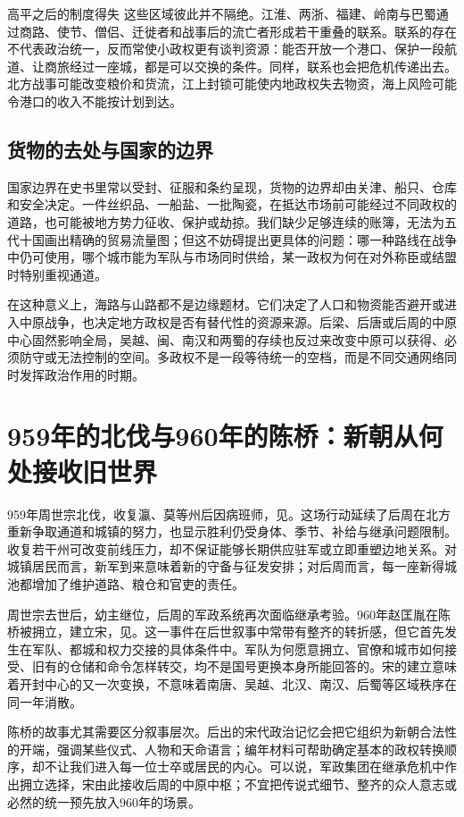 \begin{causalchain}{高平之后的制度得失}
这些区域彼此并不隔绝。江淮、两浙、福建、岭南与巴蜀通过商路、使节、僧侣、迁徙者和战事后的流亡者形成若干重叠的联系。联系的存在不代表政治统一，反而常使小政权更有谈判资源：能否开放一个港口、保护一段航道、让商旅经过一座城，都是可以交换的条件。同样，联系也会把危机传递出去。北方战事可能改变粮价和货流，江上封锁可能使内地政权失去物资，海上风险可能令港口的收入不能按计划到达。

\subsection{货物的去处与国家的边界}

国家边界在史书里常以受封、征服和条约呈现，货物的边界却由关津、船只、仓库和安全决定。一件丝织品、一船盐、一批陶瓷，在抵达市场前可能经过不同政权的道路，也可能被地方势力征收、保护或劫掠。我们缺少足够连续的账簿，无法为五代十国画出精确的贸易流量图；但这不妨碍提出更具体的问题：哪一种路线在战争中仍可使用，哪个城市能为军队与市场同时供给，某一政权为何在对外称臣或结盟时特别重视通道。

在这种意义上，海路与山路都不是边缘题材。它们决定了人口和物资能否避开或进入中原战争，也决定地方政权是否有替代性的资源来源。后梁、后唐或后周的中原中心固然影响全局，吴越、闽、南汉和两蜀的存续也反过来改变中原可以获得、必须防守或无法控制的空间。多政权不是一段等待统一的空档，而是不同交通网络同时发挥政治作用的时期。

\section{959年的北伐与960年的陈桥：新朝从何处接收旧世界}

959年周世宗北伐，收复瀛、莫等州后因病班师，见。这场行动延续了后周在北方重新争取通道和城镇的努力，也显示胜利仍受身体、季节、补给与继承问题限制。收复若干州可改变前线压力，却不保证能够长期供应驻军或立即重塑边地关系。对城镇居民而言，新军到来意味着新的守备与征发安排；对后周而言，每一座新得城池都增加了维护道路、粮仓和官吏的责任。

周世宗去世后，幼主继位，后周的军政系统再次面临继承考验。960年赵匡胤在陈桥被拥立，建立宋，见。这一事件在后世叙事中常带有整齐的转折感，但它首先发生在军队、都城和权力交接的具体条件中。军队为何愿意拥立、官僚和城市如何接受、旧有的仓储和命令怎样转交，均不是国号更换本身所能回答的。宋的建立意味着开封中心的又一次变换，不意味着南唐、吴越、北汉、南汉、后蜀等区域秩序在同一年消散。

陈桥的故事尤其需要区分叙事层次。后出的宋代政治记忆会把它组织为新朝合法性的开端，强调某些仪式、人物和天命语言；编年材料可帮助确定基本的政权转换顺序，却不让我们进入每一位士卒或居民的内心。可以说，军政集团在继承危机中作出拥立选择，宋由此接收后周的中原中枢；不宜把传说式细节、整齐的众人意志或必然的统一预先放入960年的场景。


\end{causalchain}
